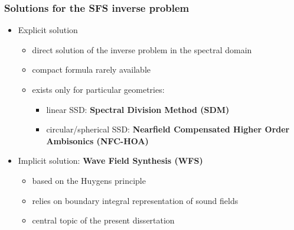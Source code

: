 \documentclass{beamer}
\begin{document}
\begin{frame}
\frametitle{Solutions for the SFS inverse problem}
\begin{itemize}
\item Explicit solution
		\begin{itemize}
		\item direct solution of the inverse problem in the spectral domain \vspace{2mm} 
		\item compact formula rarely available \vspace{2mm}
		\item exists only for particular geometries:
		\begin{itemize}
			\vspace{2mm}
			\item linear SSD: \textbf{Spectral Division Method (SDM)}
			\vspace{2mm}
			\item circular/spherical SSD: \textbf{Nearfield Compensated Higher Order Ambisonics (NFC-HOA)}
		\end{itemize}
		\end{itemize}
	\vspace{5mm}
	\item Implicit solution: \textbf{Wave Field Synthesis (WFS)}
		\begin{itemize}
		\item based on the Huygens principle \vspace{2mm}
		\item relies on boundary integral representation of sound fields \vspace{2mm}
		\item central topic of the present dissertation
		\end{itemize}
		\vspace{5mm}
\end{itemize}
\end{frame}
\end{document}
